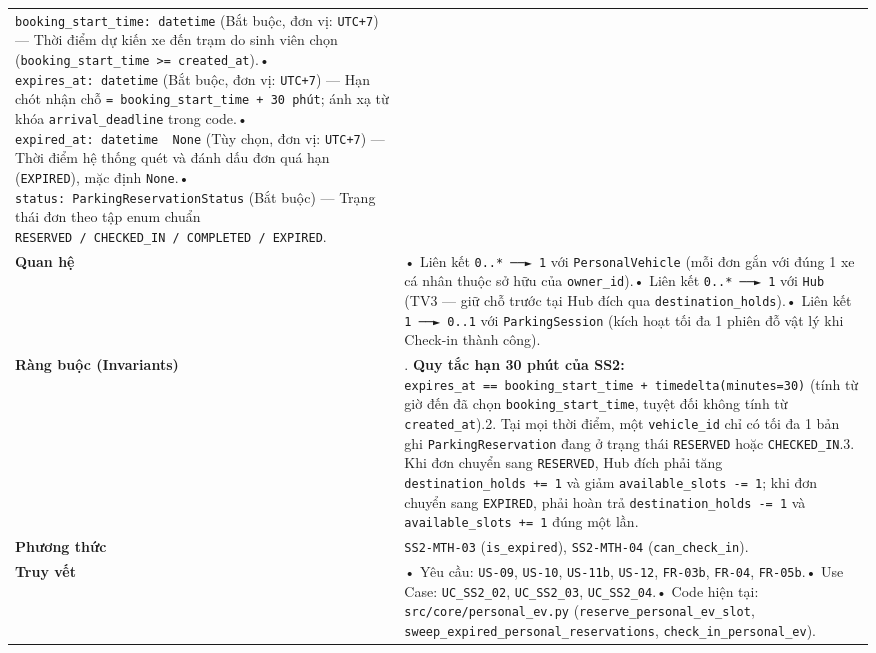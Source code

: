 \documentclass[11pt,a4paper]{article}
\begin{document}
\begin{longtable}[]{@{}
  >{\raggedright\arraybackslash}p{}
  >{\raggedright\arraybackslash}p{}@{}}
\texttt{booking\_start\_time:\ datetime} (Bắt buộc, đơn vị:
\texttt{UTC+7}) --- Thời điểm dự kiến xe đến trạm do sinh viên chọn
(\texttt{booking\_start\_time\ \textgreater{}=\ created\_at}).•
\texttt{expires\_at:\ datetime} (Bắt buộc, đơn vị: \texttt{UTC+7}) ---
Hạn chót nhận chỗ \texttt{=\ booking\_start\_time\ +\ 30\ phút}; ánh xạ
từ khóa \texttt{arrival\_deadline} trong code.•
\texttt{expired\_at:\ datetime\ \textbar{}\ None} (Tùy chọn, đơn vị:
\texttt{UTC+7}) --- Thời điểm hệ thống quét và đánh dấu đơn quá hạn
(\texttt{EXPIRED}), mặc định \texttt{None}.•
\texttt{status:\ ParkingReservationStatus} (Bắt buộc) --- Trạng thái đơn
theo tập enum chuẩn
\texttt{RESERVED\ /\ CHECKED\_IN\ /\ COMPLETED\ /\ EXPIRED}. \\
\textbf{Quan hệ} & • Liên kết \texttt{0..*\ ──►\ 1} với
\texttt{PersonalVehicle} (mỗi đơn gắn với đúng 1 xe cá nhân thuộc sở hữu
của \texttt{owner\_id}).• Liên kết \texttt{0..*\ ──►\ 1} với
\texttt{Hub} (TV3 --- giữ chỗ trước tại Hub đích qua
\texttt{destination\_holds}).• Liên kết \texttt{1\ ──►\ 0..1} với
\texttt{ParkingSession} (kích hoạt tối đa 1 phiên đỗ vật lý khi Check-in
thành công). \\
\textbf{Ràng buộc (Invariants)} & 1. \textbf{Quy tắc hạn 30 phút của
SS2:}
\texttt{expires\_at\ ==\ booking\_start\_time\ +\ timedelta(minutes=30)}
(tính từ giờ đến đã chọn \texttt{booking\_start\_time}, tuyệt đối không
tính từ \texttt{created\_at}).2. Tại mọi thời điểm, một
\texttt{vehicle\_id} chỉ có tối đa 1 bản ghi \texttt{ParkingReservation}
đang ở trạng thái \texttt{RESERVED} hoặc \texttt{CHECKED\_IN}.3. Khi đơn
chuyển sang \texttt{RESERVED}, Hub đích phải tăng
\texttt{destination\_holds\ +=\ 1} và giảm
\texttt{available\_slots\ -=\ 1}; khi đơn chuyển sang \texttt{EXPIRED},
phải hoàn trả \texttt{destination\_holds\ -=\ 1} và
\texttt{available\_slots\ +=\ 1} đúng một lần. \\
\textbf{Phương thức} & \texttt{SS2-MTH-03} (\texttt{is\_expired}),
\texttt{SS2-MTH-04} (\texttt{can\_check\_in}). \\
\textbf{Truy vết} & • Yêu cầu: \texttt{US-09}, \texttt{US-10},
\texttt{US-11b}, \texttt{US-12}, \texttt{FR-03b}, \texttt{FR-04},
\texttt{FR-05b}.• Use Case: \texttt{UC\_SS2\_02}, \texttt{UC\_SS2\_03},
\texttt{UC\_SS2\_04}.• Code hiện tại: \texttt{src/core/personal\_ev.py}
(\texttt{reserve\_personal\_ev\_slot},
\texttt{sweep\_expired\_personal\_reservations},
\texttt{check\_in\_personal\_ev}). \\
\end{longtable}
\end{document}

